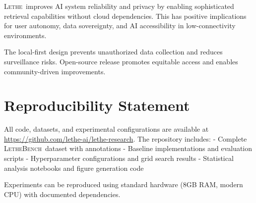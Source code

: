 \documentclass[letterpaper]{article}
\newcommand{\lethe}{\textsc{Lethe}}
\newcommand{\lethebench}{\textsc{LetheBench}}
\begin{document}
\lethe\ improves AI system reliability and privacy by enabling sophisticated retrieval capabilities without cloud dependencies. This has positive implications for user autonomy, data sovereignty, and AI accessibility in low-connectivity environments.

The local-first design prevents unauthorized data collection and reduces surveillance risks. Open-source release promotes equitable access and enables community-driven improvements.

\section*{Reproducibility Statement}

All code, datasets, and experimental configurations are available at \url{https://github.com/lethe-ai/lethe-research}. The repository includes:
- Complete \lethebench\ dataset with annotations
- Baseline implementations and evaluation scripts  
- Hyperparameter configurations and grid search results
- Statistical analysis notebooks and figure generation code

Experiments can be reproduced using standard hardware (8GB RAM, modern CPU) with documented dependencies.
\end{document}
